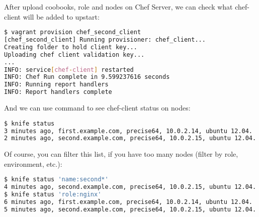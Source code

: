 After upload coobooks, role and nodes on Chef Server, we can check what chef-client will be added to upstart:

\begin{lstlisting}[language=Bash,label=lst:my-server-cloud-knife-ssh9]
$ vagrant provision chef_second_client
[chef_second_client] Running provisioner: chef_client...
Creating folder to hold client key...
Uploading chef client validation key...
...
INFO: service[chef-client] restarted
INFO: Chef Run complete in 9.599237616 seconds
INFO: Running report handlers
INFO: Report handlers complete
\end{lstlisting}

And we can use command  to see chef-client status on nodes:

\begin{lstlisting}[language=Bash,label=lst:my-server-cloud-knife-ssh10]
$ knife status
3 minutes ago, first.example.com, precise64, 10.0.2.14, ubuntu 12.04.
2 minutes ago, second.example.com, precise64, 10.0.2.15, ubuntu 12.04.
\end{lstlisting}

Of course, you can filter this list, if you have too many nodes (filter by role, environment, etc.):

\begin{lstlisting}[language=Bash,label=lst:my-server-cloud-knife-ssh11]
$ knife status 'name:second*'
4 minutes ago, second.example.com, precise64, 10.0.2.15, ubuntu 12.04.
$ knife status 'role:nginx'
6 minutes ago, first.example.com, precise64, 10.0.2.14, ubuntu 12.04.
5 minutes ago, second.example.com, precise64, 10.0.2.15, ubuntu 12.04.
\end{lstlisting}
